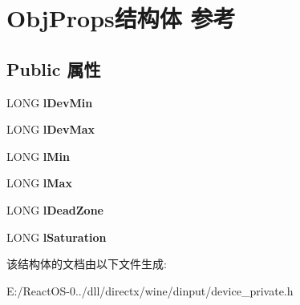 \hypertarget{struct_obj_props}{}\section{Obj\+Props结构体 参考}
\label{struct_obj_props}
\subsection*{Public 属性}
\begin{DoxyCompactItemize}
\item 
\mbox{\label{struct_obj_props_afd4d4bcfbd1d1db0b02efb361626a924}} 
L\+O\+NG {\bfseries l\+Dev\+Min}
\item 
\mbox{\label{struct_obj_props_afc87d9993f3a002d10432f3e0722e31f}} 
L\+O\+NG {\bfseries l\+Dev\+Max}
\item 
\mbox{\label{struct_obj_props_a1abfbac5e5326bf81d004ec955a94773}} 
L\+O\+NG {\bfseries l\+Min}
\item 
\mbox{\label{struct_obj_props_a17b68cc50787536159da5d698dd8fb08}} 
L\+O\+NG {\bfseries l\+Max}
\item 
\mbox{\label{struct_obj_props_a61128c51c106871a0621073753674895}} 
L\+O\+NG {\bfseries l\+Dead\+Zone}
\item 
\mbox{\label{struct_obj_props_afa5ed10d175461c30a153a0ddd7aa98e}} 
L\+O\+NG {\bfseries l\+Saturation}
\end{DoxyCompactItemize}


该结构体的文档由以下文件生成\+:\begin{DoxyCompactItemize}
\item 
E\+:/\+React\+O\+S-\/0../dll/directx/wine/dinput/device\+\_\+private.\+h\end{DoxyCompactItemize}
